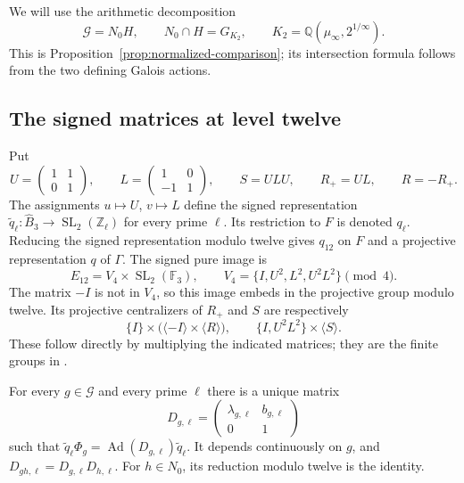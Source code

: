 We will use the arithmetic decomposition
\begin{equation}
 \mathcal G=N_0H,\qquad
 N_0\cap H=G_{K_2},\qquad
 K_2=\mathbb Q(\mu_\infty,2^{1/\infty}).
 \label{eq:gentle-arithmetic-normalization}
\end{equation}
This is Proposition~\ref{prop:normalized-comparison}; its intersection formula follows from the two defining Galois actions.

\subsection{The signed matrices at level twelve}

Put
\[
 U=\begin{pmatrix}1&1\\0&1\end{pmatrix},\qquad
 L=\begin{pmatrix}1&0\\-1&1\end{pmatrix},\qquad
 S=ULU,\qquad R_+=UL,\qquad R=-R_+.
\]
The assignments $u\mapsto U$, $v\mapsto L$ define the signed
representation $\widetilde q_\ell:\widehat B_3\to
\operatorname{SL}_2(\mathbb Z_\ell)$ for every prime $\ell$.
Its restriction to $F$ is denoted $q_\ell$. Reducing the signed
representation modulo twelve gives $q_{12}$ on $F$ and a projective
representation $q$ of $\Gamma$.
The signed pure image is
\[
 E_{12}=V_4\times\operatorname{SL}_2(\mathbb F_3),
 \qquad V_4=\{I,U^2,L^2,U^2L^2\}\pmod4.
\]
The matrix $-I$ is not in $V_4$, so this image embeds in the
projective group modulo twelve. Its projective centralizers of
$R_+$ and $S$ are respectively
\begin{equation}
 \{I\}\times\bigl(\langle-I\rangle\times\langle R\rangle\bigr),
 \qquad
 \{I,U^2L^2\}\times\langle S\rangle.
 \label{eq:finite-frame-centralizers}
\end{equation}
These follow directly by multiplying the indicated matrices; they
are the finite groups in \cite[Lemma~12]{H17}.

\begin{lemma}\label{lem:frame-all-multipliers-congruence}
For every $g\in\mathcal G$ and every prime $\ell$ there is a unique
matrix
\[
 D_{g,\ell}=\begin{pmatrix}\lambda_{g,\ell}&b_{g,\ell}\\0&1\end{pmatrix}
\]
such that
$\widetilde q_\ell\Phi_g=\operatorname{Ad}(D_{g,\ell})\widetilde q_\ell$.
It depends continuously on $g$, and $D_{gh,\ell}=D_{g,\ell}D_{h,\ell}$.
For $h\in N_0$, its reduction modulo twelve is the identity.
\end{lemma}

